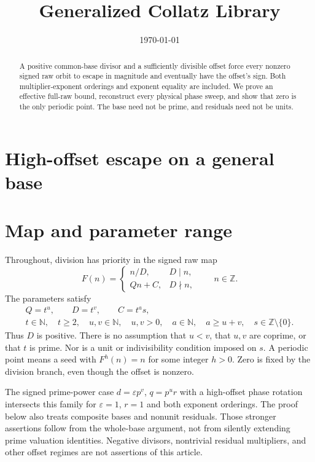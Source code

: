 \documentclass[11pt,letterpaper]{article}
\title{Generalized Collatz Library}
\author{}
\date{\today}
\newcommand{\N}{\mathbb{N}}
\newcommand{\Z}{\mathbb{Z}}
\begin{document}
\maketitle
\section*{High-offset escape on a general base}

\begin{abstract}
A positive common-base divisor and a sufficiently divisible offset force every
nonzero signed raw orbit to escape in magnitude and eventually have the offset's
sign. Both multiplier-exponent orderings and exponent equality are
included. We prove an effective full-raw bound, reconstruct every physical
phase sweep, and show that zero is the only periodic point. The base need not
be prime, and residuals need not be units.
\end{abstract}

\section{Map and parameter range}

Throughout, division has priority in the signed raw map
\[
F(n)=
\begin{cases}
n/D,&D\mid n,\\
Qn+C,&D\nmid n,
\end{cases}
\qquad n\in\Z.
\]
The parameters satisfy
\begin{equation}\label{Parameters}
\begin{gathered}
Q=t^u,\qquad D=t^v,\qquad C=t^a s,\\
t\in\N,\quad t\ge2,\quad u,v\in\N,\quad u,v>0,\quad
a\in\N,\quad a\ge u+v,\quad s\in\Z\setminus\{0\}.
\end{gathered}
\end{equation}
Thus \(D\) is positive. There is no assumption that \(u<v\), that \(u,v\)
are coprime, or that \(t\) is prime. Nor is a unit or indivisibility
condition imposed on \(s\). A periodic point means a seed with
\(F^h(n)=n\) for some integer \(h>0\). Zero is fixed by the division branch,
even though the offset is nonzero.

The signed prime-power case
\(d=\varepsilon p^v\), \(q=p^u r\) with a high-offset phase rotation
intersects this family for \(\varepsilon=1\), \(r=1\) and both exponent
orderings. The proof below also treats composite bases and nonunit
residuals. Those stronger assertions follow from the whole-base argument,
not from silently extending prime valuation identities. Negative divisors,
nontrivial residual multipliers, and other offset regimes are not assertions
of this article.
\end{document}
